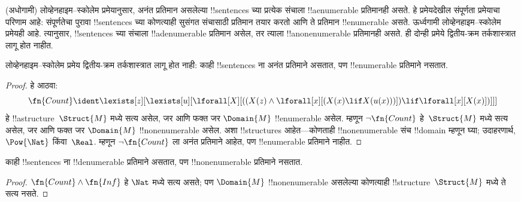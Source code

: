 \documentclass[../../../include/open-logic-section]{subfiles}
\begin{document}


\begin{explain}
(अधोगामी) लोव्हेनहाइम--स्कोलेम प्रमेयानुसार, अनंत
प्रतिमान असलेल्या !!{sentence}s च्या प्रत्येक संचाला
!!a{enumerable} प्रतिमानही असते. हे प्रमेयदेखील
संपूर्णता प्रमेयाचा परिणाम आहे: संपूर्णतेचा पुरावा
!!{sentence}s च्या कोणत्याही सुसंगत संचासाठी प्रतिमान
तयार करतो आणि ते प्रतिमान !!{enumerable} असते.
ऊर्ध्वगामी लोव्हेनहाइम--स्कोलेम प्रमेयही आहे.
त्यानुसार, !!{sentence}s च्या संचाला
!!a{denumerable} प्रतिमान असेल, तर त्याला
!!a{nonenumerable} प्रतिमानही असते. ही दोन्ही
प्रमेये द्वितीय-क्रम तर्कशास्त्रात लागू होत नाहीत.
\end{explain}


\begin{thm}
 लोव्हेनहाइम--स्कोलेम प्रमेय
द्वितीय-क्रम तर्कशास्त्रात लागू होत नाही:
काही !!{sentence}s ना अनंत प्रतिमाने असतात,
पण !!{enumerable} प्रतिमाने नसतात.
\end{thm}

\begin{proof}
हे आठवा:
\[
\fn{Count} \ident \lexists[z][\lexists[u][\lforall[X][((X(z) \land
      \lforall[x][(X(x) \lif X(u(x)))]) \lif \lforall[x][X(x)])]]]
\]
हे !!a{structure}~$\Struct{M}$ मध्ये सत्य असेल,
जर आणि फक्त जर $\Domain{M}$ !!{enumerable} असेल.
म्हणून $\lnot\fn{Count}$ हे~$\Struct{M}$ मध्ये
सत्य असेल, जर आणि फक्त जर $\Domain{M}$
!!{nonenumerable} असेल. अशा !!{structure}s
आहेत---कोणताही !!{nonenumerable} संच !!{domain}
म्हणून घ्या; उदाहरणार्थ, $\Pow{\Nat}$ किंवा~$\Real$.
म्हणून $\lnot \fn{Count}$ ला अनंत प्रतिमाने
आहेत, पण !!{enumerable} प्रतिमाने नाहीत.
\end{proof}

\begin{thm}
काही !!{sentence}s ना !!{denumerable} प्रतिमाने
असतात, पण !!{nonenumerable} प्रतिमाने नसतात.
\end{thm}

\begin{proof}
$\fn{Count} \land \fn{Inf}$ हे $\Nat$ मध्ये
सत्य असते; पण $\Domain{M}$ !!{nonenumerable}
असलेल्या कोणत्याही !!{structure}~$\Struct{M}$
मध्ये ते सत्य नसते.
\end{proof}
\end{document}
